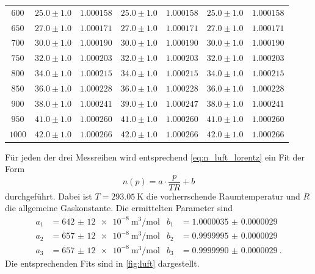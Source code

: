 \begin{table}
\begin{tabular}{c c c c c c c}
    	$600	$ & $ 25.0\pm1.0$ & $	1.000158$ & $ 	25.0\pm1.0$ & $	1.000158$ & $	25.0\pm1.0	$ & $1.000158$ \\
    	$650	$ & $ 27.0\pm1.0$ & $	1.000171$ & $ 	27.0\pm1.0$ & $	1.000171$ & $	27.0\pm1.0	$ & $1.000171$ \\
    	$700	$ & $ 30.0\pm1.0$ & $	1.000190$ & $ 	30.0\pm1.0$ & $	1.000190$ & $	30.0\pm1.0	$ & $1.000190$ \\
    	$750	$ & $ 32.0\pm1.0$ & $	1.000203$ & $ 	32.0\pm1.0$ & $	1.000203$ & $	32.0\pm1.0	$ & $1.000203$ \\
    	$800	$ & $ 34.0\pm1.0$ & $	1.000215$ & $ 	34.0\pm1.0$ & $	1.000215$ & $	34.0\pm1.0	$ & $1.000215$ \\
    	$850	$ & $ 36.0\pm1.0$ & $	1.000228$ & $ 	36.0\pm1.0$ & $	1.000228$ & $	36.0\pm1.0	$ & $1.000228$ \\
    	$900	$ & $ 38.0\pm1.0$ & $	1.000241$ & $ 	39.0\pm1.0$ & $	1.000247$ & $	38.0\pm1.0	$ & $1.000241$ \\
    	$950	$ & $ 41.0\pm1.0$ & $	1.000260$ & $ 	41.0\pm1.0$ & $	1.000260$ & $	41.0\pm1.0	$ & $1.000260$ \\
    	$1000	$ & $ 42.0\pm1.0$ & $	1.000266$ & $ 	42.0\pm1.0$ & $	1.000266$ & $	42.0\pm1.0	$ & $1.000266$ \\
        \bottomrule
    \end{tabular}
\end{table}
Für jeden der drei Messreihen wird entsprechend \autoref{eq:n_luft_lorentz} ein Fit der Form
\begin{equation*}
    n(p) = a \cdot \frac{p}{T R} + b 
\end{equation*}
durchgeführt.
Dabei ist $T = \qty{293.05}{\kelvin}$ die vorherrschende Raumtemperatur und $R$ die allgemeine Gaskonstante.
Die ermittelten Parameter sind 
\begin{align*}
    a_1 &= \qty{642(12)e-8}{\cubic\meter\per\mole} & b_1 &= \qty{1.0000035(29)}{} \\
    a_2 &= \qty{657(12)e-8}{\cubic\meter\per\mole} & b_2 &= \qty{0.9999995(29)}{} \\
    a_3 &= \qty{657(12)e-8}{\cubic\meter\per\mole} & b_3 &= \qty{0.9999990(29)}{}.
\end{align*}
Die entsprechenden Fits sind in \autoref{fig:luft} dargestellt.
